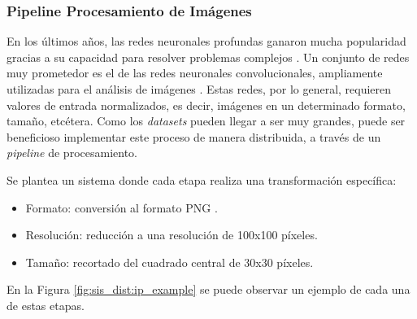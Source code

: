 \documentclass[11pt]{article}
\let\Oldsubsubsection\subsubsection
\renewcommand{\subsubsection}{\FloatBarrier\Oldsubsubsection}
\newcommand{\english}[1]{\textit{#1}}
\begin{document}
\newpage

\subsubsection{Pipeline Procesamiento de Imágenes} \label{sec:ip_desc}

En los últimos años, las redes neuronales profundas ganaron mucha popularidad gracias a su capacidad para resolver problemas complejos \cite{sis_dist:dnn}. Un conjunto de redes muy prometedor es el de las redes neuronales convolucionales, ampliamente utilizadas para el análisis de imágenes \cite{sis_dist:cnn}. Estas redes, por lo general, requieren valores de entrada normalizados, es decir, imágenes en un determinado formato, tamaño, etcétera. Como los \english{datasets} pueden llegar a ser muy grandes, puede ser beneficioso implementar este proceso de manera distribuida, a través de un \english{pipeline} de procesamiento.

Se plantea un sistema donde cada etapa realiza una transformación específica:
\begin{itemize}
    \item Formato: conversión al formato PNG \cite{sis_dist:png}.
    \item Resolución: reducción a una resolución de 100x100 píxeles.
    \item Tamaño: recortado del cuadrado central de 30x30 píxeles.
\end{itemize}

En la Figura \ref{fig:sis_dist:ip_example} se puede observar un ejemplo de cada una de estas etapas.
\end{document}
